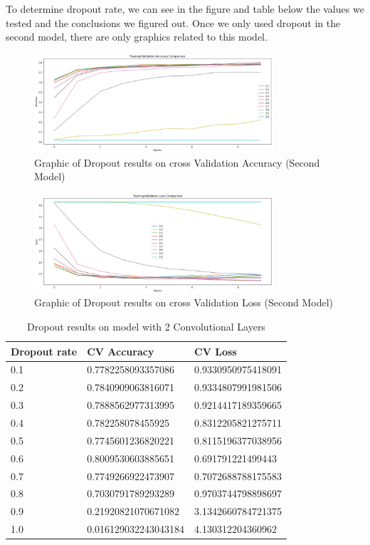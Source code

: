 \documentclass[conference]{IEEEtran}
\begin{document}
To determine dropout rate, we can see in the figure and table below the values we tested and the conclusions we figured out. Once we only used dropout in the second model, there are only graphics related to this model.

\begin{figure}[H]
    \centering
    \includegraphics[width=3.5in]{pictures/dropout_rate_accuracy.png}
    \caption{Graphic of Dropout results on cross Validation Accuracy (Second Model)}\label{fig:example4}
\end{figure}

\begin{figure}[H]
    \centering
    \includegraphics[width=3.5in]{pictures/dropout_rate_loss.png}
    \caption{Graphic of Dropout results on cross Validation Loss (Second Model)}\label{fig:example4}
\end{figure}


\begin{table}[H]
\centering
\caption{Dropout results on model with 2 Convolutional Layers}
\begin{tabular}{ | m{3.5em} | m{3.2cm}| m{3.2cm} | } 
\hline
Dropout rate & CV Accuracy & CV Loss \\ 
\hline
0.1 & 0.7782258093357086 & 0.9330950975418091 \\
\hline
0.2 & 0.7840909063816071 & 0.9334807991981506 \\
\hline
0.3 & 0.7888562977313995 & 0.9214417189359665 \\
\hline
0.4 & 0.782258078455925 & 0.8312205821275711 \\
\hline
0.5 & 0.7745601236820221 & 0.8115196377038956 \\
\hline
0.6 & 0.8009530603885651 & 0.691791221499443 \\
\hline
0.7 & 0.7749266922473907 & 0.7072688788175583 \\
\hline
0.8 & 0.7030791789293289 & 0.9703744798898697 \\
\hline
0.9 & 0.21920821070671082 & 3.1342660784721375 \\
\hline
1.0 & 0.016129032243043184 & 4.130312204360962 \\
\hline
\end{tabular}
\end{table}
\end{document}
